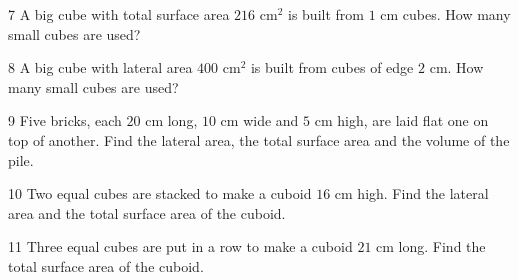\gap
\begin{probbox}{7}{\relax}
A big cube with total surface area $216$ cm$^2$ is built from $1$ cm cubes. How many small cubes are used?
\end{probbox}
\gap
\begin{probbox}{8}{\relax}
A big cube with lateral area $400$ cm$^2$ is built from cubes of edge $2$ cm. How many small cubes are used?
\end{probbox}
\gap
\begin{probbox}{9}{\relax}
Five bricks, each $20$ cm long, $10$ cm wide and $5$ cm high, are laid flat one on top of another. Find the lateral area, the total surface area and the volume of the pile.
\end{probbox}
\gap
\begin{probbox}{10}{\relax}
Two equal cubes are stacked to make a cuboid $16$ cm high. Find the lateral area and the total surface area of the cuboid.
\end{probbox}
\gap
\begin{probbox}{11}{\relax}
Three equal cubes are put in a row to make a cuboid $21$ cm long. Find the total surface area of the cuboid.
\end{probbox}
